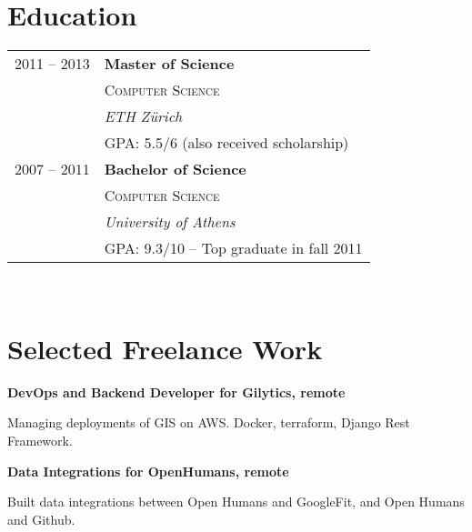 \documentclass[9pt]{article} %
\begin{document}
\begin{minipage}[t]{0.5\textwidth} %
\vspace{0pt} %
	

\section{Education} 

\begin{tabular}{rl} %



2011 -- 2013 & \textbf{Master of Science} \\ 
& \textsc{Computer Science} \\ 
& \textit{ETH Z\"urich}\\
    \small  & GPA: 5.5/6 (also received scholarship) \\
2007 -- 2011 & \textbf{Bachelor of Science}\\
& \textsc{Computer Science} \\
& \textit{University of Athens} \\
\small  & GPA: 9.3/10 -- Top graduate in fall 2011\\
	
\end{tabular}\\[9pt]


\section{Selected Freelance Work} 

{\raggedright\large \textbf{DevOps and Backend Developer for Gilytics, remote}\\
}

\normalsize{Managing deployments of GIS on AWS. Docker, terraform, Django Rest Framework.}
\\

{\raggedright\large \textbf{Data Integrations for OpenHumans, remote}\\
}

\normalsize{Built data integrations between Open Humans and GoogleFit, and Open Humans and Github.

}
\end{minipage}
\end{document}
